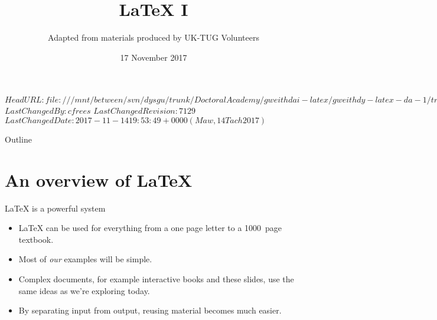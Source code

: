 \svnidlong
{$HeadURL: file:///mnt/between/svn/dysgu/trunk/DoctoralAcademy/gweithdai-latex/gweithdy-latex-da-1/training.tex $}
{$LastChangedBy: cfrees $}
{$LastChangedRevision: 7129 $}
{$LastChangedDate: 2017-11-14 19:53:49 +0000 (Maw, 14 Tach 2017) $}



\AtBeginDocument
{
  \renewcommand*{\LaTeX}{LaTeX}
  \renewcommand*{\LaTeXe}{LaTeX2e}
  \renewcommand*{\TeX}{TeX}
}

\title{\LaTeX{} I}
\subtitle{Adapted from materials produced by UK-TUG Volunteers}
\date{ 17 November 2017}




\begin{frame}
  \titlepage
\end{frame}

\maketitle


\tableofcontents

%
{
  \begin{frame}{Outline}
	\tableofcontents
  \end{frame}
}

\section{An overview of \LaTeX{}}

\begin{frame}{\LaTeX{} is a powerful system}

  \begin{itemize}
	\item \LaTeX{} can be used for everything from a one page letter to a 1000~page textbook.
	\item Most of \emph{our} examples will be simple.
	\item Complex documents, for example interactive books and these slides, use the same ideas as we're exploring today.
	\item By separating input from output, reusing material becomes much easier.
  \end{itemize}

\end{frame}

